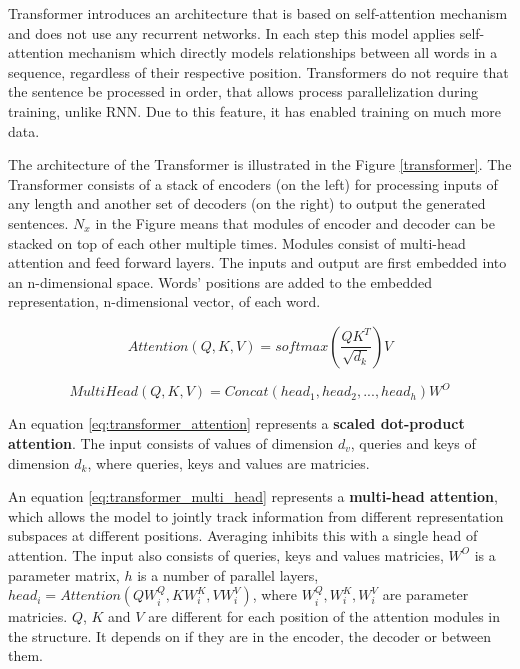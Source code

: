 Transformer introduces an architecture that is based on self-attention mechanism and does not use any recurrent networks. In each step this model applies self-attention mechanism which directly models relationships between all words in a sequence, regardless of their respective position. Transformers do not require that the sentence be processed in order, that allows process parallelization during training, unlike RNN. Due to this feature, it has enabled training on much more data. 

The architecture of the Transformer is illustrated in the Figure \ref{transformer}. The Transformer consists of a stack of encoders (on the left) for processing inputs of any length and another set of decoders (on the right) to output the generated sentences. $N_x$ in the Figure means that modules of encoder and decoder can be stacked on top of each other multiple times. Modules consist of multi-head attention and feed forward layers. The inputs and output are first embedded into an n-dimensional space. Words' positions are added to the embedded representation, n-dimensional vector, of each word.

\begin{equation} \label{eq:transformer_attention}
Attention(Q, K, V) = softmax(\frac{QK^T}{\sqrt{d_k}})V
\end{equation}

\begin{equation} \label{eq:transformer_multi_head}
MultiHead(Q, K, V) = Concat(head_1, head_2, ..., head_h)W^O
\end{equation}

An equation \ref{eq:transformer_attention} represents a \textbf{scaled dot-product attention}. The input consists of values of dimension $d_v$, queries and keys of dimension $d_k$, where queries, keys and values are matricies.

An equation \ref{eq:transformer_multi_head} represents a \textbf{multi-head attention}, which allows the model to jointly track information from different representation subspaces at different positions. Averaging inhibits this with a single head of attention. The input also consists of queries, keys and values matricies, $W^O$ is a parameter matrix, $h$ is a number of parallel layers, $head_i = Attention(QW_i^Q, KW_i^K, VW_i^V)$, where $W_i^Q, W_i^K, W_i^V$ are parameter matricies. $Q$, $K$ and $V$ are different for each position of the attention modules in the structure. It depends on if they are in the encoder, the decoder or between them.

